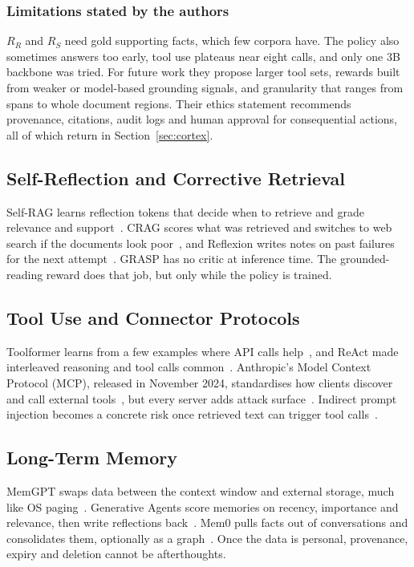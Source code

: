 \documentclass[conference]{IEEEtran}
\begin{document}
\subsubsection{Limitations stated by the authors}
$R_R$ and $R_S$ need gold supporting facts, which few corpora have. The policy also sometimes answers too early, tool use plateaus near eight calls, and only one 3B backbone was tried. For future work they propose larger tool sets, rewards built from weaker or model-based grounding signals, and granularity that ranges from spans to whole document regions. Their ethics statement recommends provenance, citations, audit logs and human approval for consequential actions, all of which return in Section~\ref{sec:cortex}.

\subsection{Self-Reflection and Corrective Retrieval}
Self-RAG learns reflection tokens that decide when to retrieve and grade relevance and support~\cite{asai2024selfrag}. CRAG scores what was retrieved and switches to web search if the documents look poor~\cite{yan2024crag}, and Reflexion writes notes on past failures for the next attempt~\cite{shinn2023reflexion}. GRASP has no critic at inference time. The grounded-reading reward does that job, but only while the policy is trained.

\subsection{Tool Use and Connector Protocols}
Toolformer learns from a few examples where API calls help~\cite{schick2023toolformer}, and ReAct made interleaved reasoning and tool calls common~\cite{yao2023react}. Anthropic's Model Context Protocol (MCP), released in November 2024, standardises how clients discover and call external tools~\cite{anthropic2024mcp}, but every server adds attack surface~\cite{hou2025mcp}. Indirect prompt injection becomes a concrete risk once retrieved text can trigger tool calls~\cite{greshake2023injection}.

\subsection{Long-Term Memory}
MemGPT swaps data between the context window and external storage, much like OS paging~\cite{packer2023memgpt}. Generative Agents score memories on recency, importance and relevance, then write reflections back~\cite{park2023generative}. Mem0 pulls facts out of conversations and consolidates them, optionally as a graph~\cite{chhikara2025mem0}. Once the data is personal, provenance, expiry and deletion cannot be afterthoughts.
\end{document}
